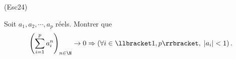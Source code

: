 \begin{tiny}(Esc24)\end{tiny} Soit $a_1,a_2,\cdots,a_p$ réels. Montrer que
\[
 \left( \sum_{i=1}^{p}a_i^n\right) _{n\in \N}\rightarrow 0 \Rightarrow \left(\forall i \in \llbracket 1,p \rrbracket, \; |a_i| < 1 \right).
\]
